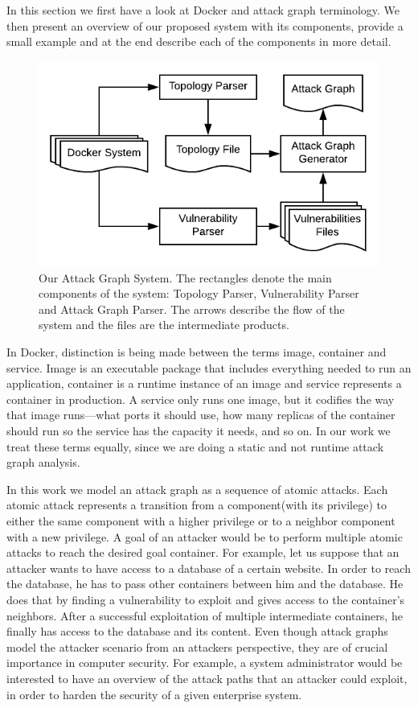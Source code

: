 \documentclass[letterpaper, 10 pt, conference]{ieeeconf}  %
\begin{document}
In this section we first have a look at Docker and attack graph terminology. We then present an overview of our proposed system with its components, provide a small example and at the end describe each of the components in more detail. 

\begin{figure}
	\includegraphics[width=\textwidth]{AttackGraphSystem}
	\caption{Our Attack Graph System. The rectangles denote the main components of the system: Topology Parser, Vulnerability Parser and Attack Graph Parser. The arrows describe the flow of the system and the files are the intermediate products.}
	\label{AttackGraphSystem}
\end{figure}

In Docker, distinction is being made between the terms image, container and service. Image is an executable package that includes everything needed to run an application, container is a runtime instance of an image and service represents a container in production. A service only runs one image, but it codifies the way that image runs—what ports it should use, how many replicas of the container should run so the service has the capacity it needs, and so on. In our work we treat these terms equally, since we are doing a static and not runtime attack graph analysis.\cite{docker}

In this work we model an attack graph as a sequence of atomic attacks. Each atomic attack represents a transition from a component(with its privilege) to either the same component with a higher privilege or to a neighbor component with a new privilege. A goal of an attacker would be to perform multiple atomic attacks to reach the desired goal container. For example, let us suppose that an attacker wants to have access to a database of a certain website. In order to reach the database, he has to pass other containers between him and the database. He does that by finding a vulnerability to exploit and gives access to the container's neighbors. After a successful exploitation of multiple intermediate containers, he finally has access to the database and its content. Even though attack graphs model the attacker scenario from an attackers perspective, they are of crucial importance in computer security. For example, a system administrator would be interested to have an overview of the attack paths that an attacker could exploit, in order to harden the security of a given enterprise system.
\end{document}
